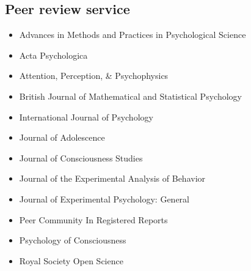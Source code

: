 \documentclass[12pt, a4paper]{article}
\begin{document}
\subsection*{Peer review service}
\begin{itemize}
  \item Advances in Methods and Practices in Psychological Science
  \item Acta Psychologica
  \item Attention, Perception, \& Psychophysics
  \item British Journal of Mathematical and Statistical Psychology
  \item International Journal of Psychology
  \item Journal of Adolescence
  \item Journal of Consciousness Studies
  \item Journal of the Experimental Analysis of Behavior
  \item Journal of Experimental Psychology: General
  \item Peer Community In Registered Reports
  \item Psychology of Consciousness
  \item Royal Society Open Science
\end{itemize}

\vfill{}
\end{document}

